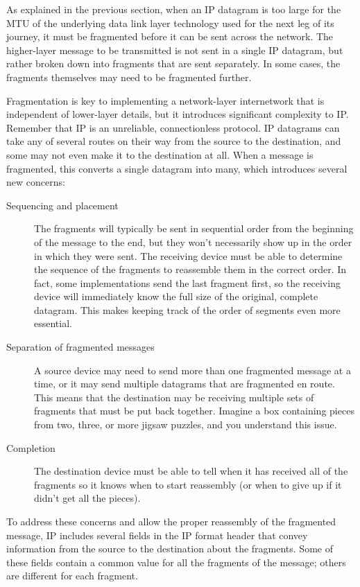As explained in the previous section, when an IP datagram is too large
for the MTU of the underlying data link layer technology used for the
next leg of its journey, it must be fragmented before it can be sent
across the network. The higher-layer message to be transmitted is not
sent in a single IP datagram, but rather broken down into fragments that
are sent separately. In some cases, the fragments themselves may need to
be fragmented further.

Fragmentation is key to implementing a network-layer internetwork that is independent
of lower-layer details, but it introduces significant complexity to IP.
Remember that IP is an unreliable, connectionless protocol. IP datagrams
can take any of several routes on their way from the source to the
destination, and some may not even make it to the destination at all.
When a message is fragmented, this converts a single datagram into many,
which introduces several new concerns:

\begin{description}
   \item[Sequencing and placement]
      The fragments will typically be sent in sequential order from the beginning of the message to the end,
      but they won't necessarily show up in the order in which they were sent.
      The receiving device must be able to determine the sequence of the fragments to reassemble them in the correct order.
      In fact, some implementations send the last fragment first, so the receiving device will immediately know the full size of the original, complete datagram.
      This makes keeping track of the order of segments even more essential.

   \item[Separation of fragmented messages]
      A source device may need to send more than one fragmented message at a time, or it may send multiple datagrams that are fragmented en route.
      This means that the destination may be receiving multiple sets of fragments that must be put back together.
      Imagine a box containing pieces from two, three, or more jigsaw puzzles, and you understand this issue.

   \item[Completion]
      The destination device must be able to tell when it has received all of the fragments so it knows when to start reassembly
      (or when to give up if it didn't get all the pieces).
\end{description}

To address these concerns and allow the proper reassembly of the fragmented message,
IP includes several fields in the IP format header that convey information from the source to the destination about the fragments.
Some of these fields contain a common value for all the fragments of the message; others are different for each fragment.




